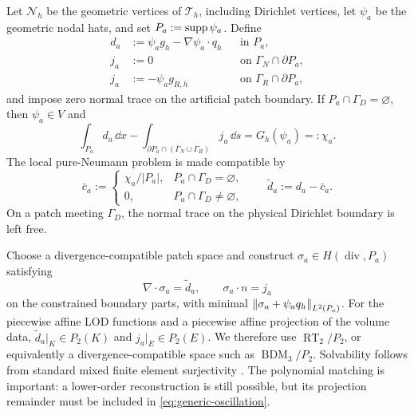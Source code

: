 Let $\mathcal N_h$ be the geometric vertices of $\mathcal T_h$, including
Dirichlet vertices, let $\psi_a$ be the geometric nodal hats, and set
$P_a:=\operatorname{supp}\psi_a$.  Define
\begin{align}
  d_a&:=\psi_a g_h-\nabla\psi_a\cdot q_h
       &&\text{in }P_a,
  \label{eq:generic-patch-source}\\
  j_a&:=0
       &&\text{on }\Gamma_N\cap\partial P_a,
  \label{eq:generic-patch-N}\\
  j_a&:=-\psi_a g_{R,h}
       &&\text{on }\Gamma_R\cap\partial P_a,
  \label{eq:generic-patch-R}
\end{align}
and impose zero normal trace on the artificial patch boundary.  If
$P_a\cap\Gamma_D=\varnothing$, then $\psi_a\in V$ and
\begin{equation}
\label{eq:generic-compatibility-defect}
  \int_{P_a}d_a\,\dd x
  -\int_{\partial P_a\cap(\Gamma_N\cup\Gamma_R)}j_a\,\dd s
  =G_h(\psi_a)=:\chi_a.
\end{equation}
The local pure-Neumann problem is made compatible by
\begin{equation}
\label{eq:generic-compatibility-correction}
  \bar c_a
  :=\begin{cases}
      \chi_a/|P_a|,&P_a\cap\Gamma_D=\varnothing,\\
      0,&P_a\cap\Gamma_D\neq\varnothing,
    \end{cases}
  \qquad
  \widetilde d_a:=d_a-\bar c_a.
\end{equation}
On a patch meeting $\Gamma_D$, the normal trace on the physical Dirichlet
boundary is left free.

Choose a divergence-compatible patch space and construct
$\sigma_a\in H(\operatorname{div},P_a)$ satisfying
\begin{equation}
\label{eq:generic-local-flux}
  \nabla\!\cdot\sigma_a=\widetilde d_a,
  \qquad
  \sigma_a\cdot n=j_a
\end{equation}
on the constrained boundary parts, with minimal
$\left\lVert \sigma_a+\psi_aq_h\right\rVert_{L^2(P_a)}$.  For the piecewise affine LOD
functions and a piecewise affine projection of the volume data,
$\widetilde d_a|_K\in P_2(K)$ and $j_a|_E\in P_2(E)$.  We therefore use
$\operatorname{RT}_2/P_2$, or equivalently a divergence-compatible space
such as $\operatorname{BDM}_3/P_2$.  Solvability follows from standard
mixed finite element surjectivity
\cite{BoffiBrezziFortin2013,ErnVohralik2015}.  The polynomial matching is
important: a lower-order reconstruction is still possible, but its
projection remainder must be included in \eqref{eq:generic-oscillation}.

